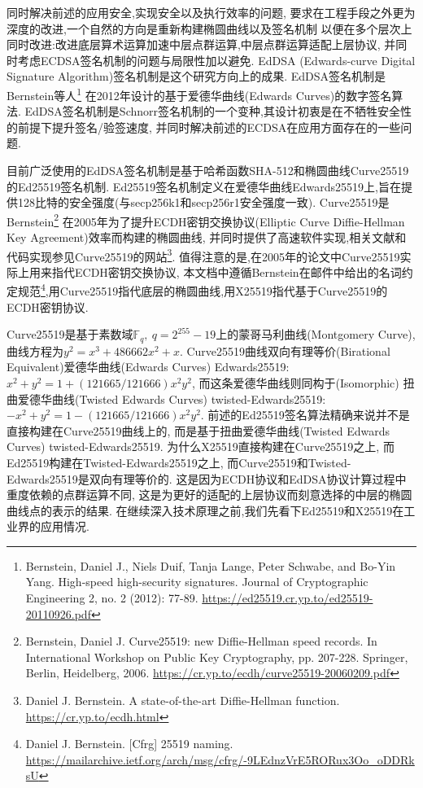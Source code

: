 \documentclass{article}
\newcommand{\F}{\mathbb{F}}
\newcommand{\red}{\textcolor{red}}
\begin{document}
同时解决前述的应用安全,实现安全以及执行效率的问题,
要求在工程手段之外更为深度的改进,一个自然的方向是重新构建椭圆曲线以及签名机制
以便在多个层次上同时改进:改进底层算术运算加速中层点群运算,中层点群运算适配上层协议,
并同时考虑ECDSA签名机制的问题与局限性加以避免.
EdDSA (Edwards-curve Digital Signature Algorithm)签名机制是这个研究方向上的成果.
EdDSA签名机制是Bernstein等人\footnote{
Bernstein, Daniel J., Niels Duif, Tanja Lange, Peter Schwabe, and Bo-Yin Yang. 
High-speed high-security signatures. Journal of Cryptographic Engineering 2, no. 2 (2012): 77-89.
\url{https://ed25519.cr.yp.to/ed25519-20110926.pdf}}
在2012年设计的基于爱德华曲线(Edwards Curves)的数字签名算法.
EdDSA签名机制是Schnorr签名机制的一个变种,其设计初衷是在不牺牲安全性的前提下提升签名/验签速度,
并同时解决前述的ECDSA在应用方面存在的一些问题.

目前广泛使用的EdDSA签名机制是基于哈希函数SHA-512和椭圆曲线Curve25519的Ed25519签名机制.
Ed25519签名机制定义在爱德华曲线Edwards25519上,旨在提供128比特的安全强度(与secp256k1和secp256r1安全强度一致).
Curve25519是Bernstein\footnote{
Bernstein, Daniel J. Curve25519: new Diffie-Hellman speed records.
In International Workshop on Public Key Cryptography, pp. 207-228. Springer, Berlin, Heidelberg, 2006.
\url{https://cr.yp.to/ecdh/curve25519-20060209.pdf}}
在2005年为了提升ECDH密钥交换协议(Elliptic Curve Diffie-Hellman Key Agreement)效率而构建的椭圆曲线,
并同时提供了高速软件实现,相关文献和代码实现参见Curve25519的网站\footnote{
Daniel J. Bernstein. A state-of-the-art Diffie-Hellman function. \url{https://cr.yp.to/ecdh.html}}.
值得注意的是,在2005年的论文中Curve25519实际上用来指代ECDH密钥交换协议,
本文档中遵循Bernstein在邮件中给出的名词约定规范\footnote{
Daniel J. Bernstein. [Cfrg] 25519 naming.
\url{https://mailarchive.ietf.org/arch/msg/cfrg/-9LEdnzVrE5RORux3Oo_oDDRksU}
},用Curve25519指代底层的椭圆曲线,用X25519指代基于Curve25519的ECDH密钥协议.

Curve25519是基于素数域$\F_q, \ q = 2^{255}-19$上的蒙哥马利曲线(Montgomery Curve),
曲线方程为$y^2 = x^3 + 486662x^2 + x$.
Curve25519曲线双向有理等价(Birational Equivalent)爱德华曲线(Edwards Curves) Edwards25519:
$x^2 + y^2 = 1 + (121665/121666)x^2y^2$, 而这条爱德华曲线则同构于(Isomorphic)
扭曲爱德华曲线(Twisted Edwards Curves) twisted-Edwards25519: $-x^2+y^2 = 1 - (121665/121666)x^2y^2$.
前述的Ed25519签名算法精确来说并不是直接构建在Curve25519曲线上的,
而是基于扭曲爱德华曲线(Twisted Edwards Curves) twisted-Edwards25519.
为什么X25519直接构建在Curve25519之上, 而Ed25519构建在Twisted-Edwards25519之上,
而Curve25519和Twisted-Edwards25519是双向有理等价的.
这是因为ECDH协议和EdDSA协议计算过程中重度依赖的点群运算不同,
这是为更好的适配的上层协议而刻意选择的中层的椭圆曲线点的表示的结果.
在继续深入技术原理之前,我们先看下Ed25519和X25519在工业界的应用情况.
\end{document}
